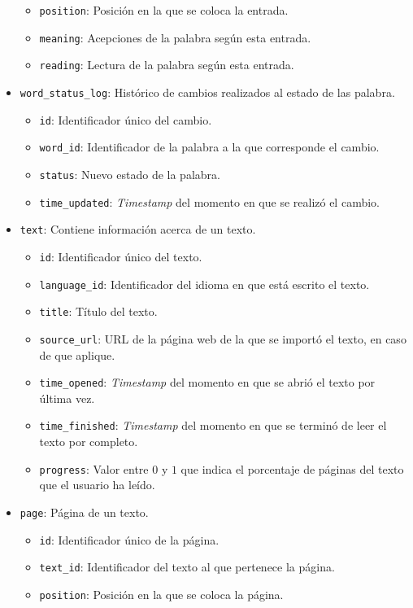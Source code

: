 \begin{itemize}
\begin{itemize}[label=$\star$]
		\item \texttt{position}: Posición en la que se coloca la entrada.
		\item \texttt{meaning}: Acepciones de la palabra según esta entrada.
		\item \texttt{reading}: Lectura de la palabra según esta entrada.
	\end{itemize}
	\item \texttt{word\_status\_log}: Histórico de cambios realizados al estado de las palabra.
	\begin{itemize}[label=$\star$]
		\item \texttt{id}: Identificador único del cambio.
		\item \texttt{word\_id}: Identificador de la palabra a la que corresponde el cambio.
		\item \texttt{status}: Nuevo estado de la palabra.
		\item \texttt{time\_updated}: \textit{Timestamp} del momento en que se realizó el cambio.
	\end{itemize}
	\item \texttt{text}: Contiene información acerca de un texto.
	\begin{itemize}[label=$\star$]
		\item \texttt{id}: Identificador único del texto.
		\item \texttt{language\_id}: Identificador del idioma en que está escrito el texto.
		\item \texttt{title}: Título del texto.
		\item \texttt{source\_url}: URL de la página web de la que se importó el texto, en caso de que aplique.
		\item \texttt{time\_opened}: \textit{Timestamp} del momento en que se abrió el texto por última vez.
		\item \texttt{time\_finished}: \textit{Timestamp} del momento en que se terminó de leer el texto por completo.
		\item \texttt{progress}: Valor entre $0$ y $1$ que indica el porcentaje de páginas del texto que el usuario ha leído.
	\end{itemize}
	\item \texttt{page}: Página de un texto.
	\begin{itemize}[label=$\star$]
		\item \texttt{id}: Identificador único de la página.
		\item \texttt{text\_id}: Identificador del texto al que pertenece la página.
		\item \texttt{position}: Posición en la que se coloca la página.

\end{itemize}
\end{itemize}
